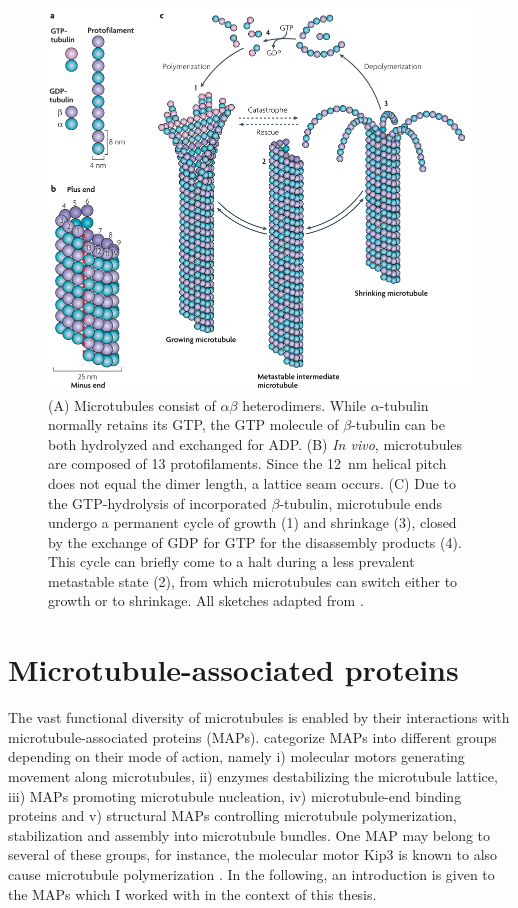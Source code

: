 \begin{figure}[h!tb]
\centering
\includegraphics[scale=0.65]{Figures/MTintro.png}
\caption[Introduction to microtubules.]{
(A) Microtubules consist of $\alpha\beta$ heterodimers. While $\alpha$-tubulin normally retains its GTP, the GTP molecule of $\beta$-tubulin can be both hydrolyzed and exchanged for ADP. (B) \textit{In vivo}, microtubules are composed of 13 protofilaments. Since the \SI{12}{\nm} helical pitch does not equal the dimer length, a lattice seam occurs. (C) Due to the GTP-hydrolysis of incorporated $\beta$-tubulin, microtubule ends undergo a permanent cycle of growth (1) and shrinkage (3), closed by the exchange of GDP for GTP for the disassembly products (4). This cycle can briefly come to a halt during a less prevalent metastable state (2), from which microtubules can switch either to growth or to shrinkage. All sketches adapted from \cite{Akhmanova2008}.
	}\label{MTintro}
\end{figure}
 \FloatBarrier

\section{Microtubule-associated proteins}
The vast functional diversity of microtubules is enabled by their interactions with microtubule-associated proteins (MAPs). \cite{BODAKUNTLA2019804} categorize MAPs into different groups depending on their mode of action, namely i) molecular motors
generating movement along microtubules, ii) enzymes destabilizing the microtubule lattice, iii) MAPs promoting microtubule nucleation, iv) microtubule-end binding proteins and v) structural MAPs controlling microtubule polymerization, stabilization and assembly into microtubule bundles. One MAP may belong to several of these groups, for instance, the molecular motor Kip3 is known to also cause microtubule polymerization \parencite{Gardner2011a}. In the following, an introduction is given to the MAPs which I worked with in the context of this thesis.

